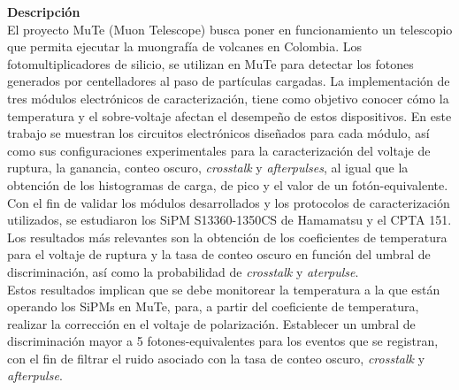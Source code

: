 \noindent \textbf{Descripción}\\
El proyecto MuTe (Muon Telescope) busca poner en funcionamiento un telescopio que permita ejecutar la muongrafía de volcanes en Colombia. Los fotomultiplicadores de silicio, se utilizan en MuTe para detectar los fotones generados por centelladores al paso de partículas cargadas. La implementación de tres módulos electrónicos de caracterización, tiene como objetivo conocer cómo la temperatura y el sobre-voltaje afectan el desempeño de estos dispositivos. En este trabajo se muestran los circuitos electrónicos diseñados para cada módulo, así como sus configuraciones experimentales para la caracterización del voltaje de ruptura, la ganancia, conteo oscuro, \textit{crosstalk} y \textit{afterpulses}, al igual que la obtención de los histogramas de carga, de pico y el valor de un fotón-equivalente.\\
Con el fin de validar los módulos desarrollados y los protocolos de caracterización utilizados, se estudiaron los SiPM S13360-1350CS de Hamamatsu y el CPTA 151. Los resultados más relevantes son la obtención de los coeficientes de temperatura para el voltaje de ruptura y la tasa de conteo oscuro en función del umbral de discriminación, así como la probabilidad de \textit{crosstalk} y \textit{aterpulse}. \\
Estos resultados implican que se debe monitorear la temperatura a la que están operando los SiPMs en MuTe, para, a partir del coeficiente de temperatura, realizar la corrección en el voltaje de polarización. Establecer un umbral de discriminación mayor a 5 fotones-equivalentes para los eventos que se registran, con el fin de filtrar el ruido asociado con la tasa de conteo oscuro, \textit{crosstalk} y \textit{afterpulse}.   


			
				

